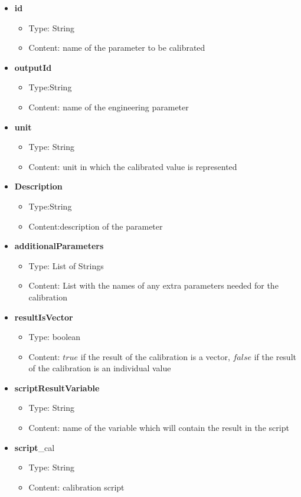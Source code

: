 \begin{itemize}

	\item \textbf{id}
		\begin{itemize}
			\item Type: String
			\item Content: name of the parameter to be calibrated
		\end{itemize}
	\item \textbf{outputId}
		\begin{itemize}
			\item Type:String
			\item Content: name of the engineering parameter
		\end{itemize}
	\item \textbf{unit}
		\begin{itemize}
			\item Type: String
			\item Content: unit in which the calibrated value is represented
		\end{itemize}
	\item \textbf{Description}
		\begin{itemize}
			\item Type:String
			\item Content:description of the parameter
		\end{itemize}
	
	\item \textbf{additionalParameters}
		\begin{itemize}
			\item Type: List of Strings
			\item Content: List with the names of any extra parameters needed for the calibration
		\end{itemize}
	\item \textbf{resultIsVector}
		\begin{itemize}
			\item Type: boolean
			\item Content: $true$ if the result of the calibration is a vector, $false$ if the result of the calibration is an individual value 
		\end{itemize}
	\item \textbf{scriptResultVariable}
		\begin{itemize}
			\item Type: String
			\item Content: name of the variable which will contain the result in the script
		\end{itemize}
	\item \textbf{script}\_cal
		\begin{itemize}
			\item Type: String
			\item Content: calibration script
		\end{itemize}						
		
\end{itemize}


